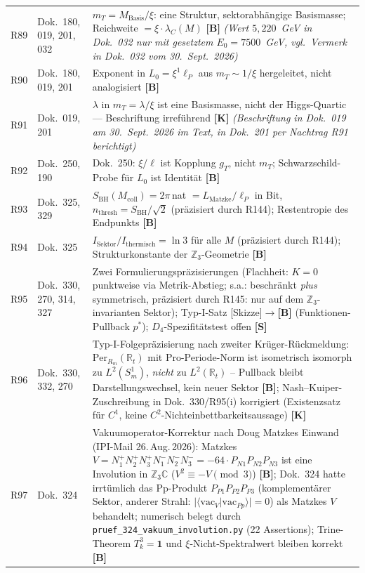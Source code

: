 \begin{longtable}{@{}p{0.9cm}p{3.1cm}p{10.2cm}@{}}
R89 & Dok.~180, 019, 201, 032 & $m_T = M_\mathrm{Basis}/\xi$: eine Struktur, sektorabh\"angige Basismasse; Reichweite $=\xi\cdot\lambda_C(M)$ \textbf{[B]} \emph{(Wert $5{,}220$~GeV in Dok.~032 nur mit gesetztem $E_0=7500$~GeV, vgl.\ Vermerk in Dok.~032 vom 30.~Sept.~2026)} \\
R90 & Dok.~180, 019, 201 & Exponent in $L_0 = \xi^1\ell_P$ aus $m_T\sim1/\xi$ hergeleitet, nicht analogisiert \textbf{[B]} \\
R91 & Dok.~019, 201 & $\lambda$ in $m_T=\lambda/\xi$ ist eine Basismasse, nicht der Higgs-Quartic --- Beschriftung irref\"uhrend \textbf{[K]} \emph{(Beschriftung in Dok.~019 am 30.~Sept.~2026 im Text, in Dok.~201 per Nachtrag R91 berichtigt)} \\
R92 & Dok.~250, 190 & Dok.~250: $\xi/\ell$ ist Kopplung $g_T$, nicht $m_T$; Schwarzschild-Probe f\"ur $L_0$ ist Identit\"at \textbf{[B]} \\
R93 & Dok.~325, 329 & $S_\mathrm{BH}(M_\mathrm{coll}) = 2\pi$\,nat $= L_\mathrm{Matzke}/\ell_P$ in Bit, $n_\mathrm{thresh} = S_\mathrm{BH}/\sqrt{2}$ (präzisiert durch R144); Restentropie des Endpunkts \textbf{[B]} \\
R94 & Dok.~325 & $I_\mathrm{Sektor}/I_\mathrm{thermisch} = \ln 3$ für alle $M$ (präzisiert durch R144); Strukturkonstante der $\mathbb{Z}_3$-Geometrie \textbf{[B]} \\
R95 & Dok.~330, 270, 314, 327 & Zwei Formulierungspräzisierungen (Flachheit: $K{=}0$ punktweise via Metrik-Abstieg; s.a.: beschränkt \emph{plus} symmetrisch, präzisiert durch R145: nur auf dem $\mathbb{Z}_3$-invarianten Sektor); Typ-I-Satz [Skizze]$\to$\textbf{[B]} (Funktionen-Pullback $p^*$); $D_4$-Spezifitätstest offen \textbf{[S]} \\
R96 & Dok.~330, 332, 270 & Typ-I-Folgepräzisierung nach zweiter Krüger-Rückmeldung: $\mathrm{Per}_{R_m}(\mathbb{R}_t)$ mit Pro-Periode-Norm ist isometrisch isomorph zu $L^2(S^1_m)$, \emph{nicht} zu $L^2(\mathbb{R}_t)$ -- Pullback bleibt Darstellungswechsel, kein neuer Sektor \textbf{[B]}; Nash--Kuiper-Zuschreibung in Dok.~330/R95(i) korrigiert (Existenzsatz für $C^1$, keine $C^2$-Nichteinbettbarkeitsaussage) \textbf{[K]} \\
R97 & Dok.~324 & Vakuumoperator-Korrektur nach Doug Matzkes Einwand (IPI-Mail 26.\,Aug.\,2026): Matzkes $V = N_1^+N_2^+N_3^+N_1^-N_2^-N_3^- = -64\cdot P_{N1}P_{N2}P_{N3}$ ist eine Involution in $\mathbb{Z}_3\mathbb{C}$ ($V^2 \equiv -V \pmod{3}$) \textbf{[B]}; Dok.~324 hatte irrtümlich das Pp-Produkt $P_{P1}P_{P2}P_{P3}$ (komplementärer Sektor, anderer Strahl: $|\langle\mathrm{vac}_V|\mathrm{vac}_{Pp}\rangle|=0$) als Matzkes $V$ behandelt; numerisch belegt durch \texttt{pruef\_324\_vakuum\_involution.py} (22 Assertions); Trine-Theorem $T_k^3=\mathbf{1}$ und $\xi$-Nicht-Spektralwert bleiben korrekt \textbf{[B]} \\

\end{longtable}

